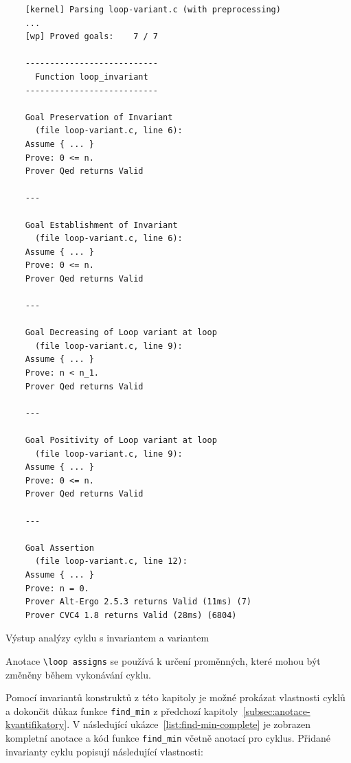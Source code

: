 \begin{listing}[H]
    \begin{verbatim}
    [kernel] Parsing loop-variant.c (with preprocessing)
    ...
    [wp] Proved goals:    7 / 7

    ---------------------------
      Function loop_invariant
    ---------------------------

    Goal Preservation of Invariant
      (file loop-variant.c, line 6):
    Assume { ... }
    Prove: 0 <= n.
    Prover Qed returns Valid

    ---

    Goal Establishment of Invariant
      (file loop-variant.c, line 6):
    Assume { ... }
    Prove: 0 <= n.
    Prover Qed returns Valid

    ---

    Goal Decreasing of Loop variant at loop
      (file loop-variant.c, line 9):
    Assume { ... }
    Prove: n < n_1.
    Prover Qed returns Valid

    ---

    Goal Positivity of Loop variant at loop
      (file loop-variant.c, line 9):
    Assume { ... }
    Prove: 0 <= n.
    Prover Qed returns Valid

    ---

    Goal Assertion
      (file loop-variant.c, line 12):
    Assume { ... }
    Prove: n = 0.
    Prover Alt-Ergo 2.5.3 returns Valid (11ms) (7)
    Prover CVC4 1.8 returns Valid (28ms) (6804)
    \end{verbatim}
    \caption{Výstup analýzy cyklu s invariantem a variantem}
    \label{list:loop-with-variant-output}
\end{listing}

Anotace \texttt{\textbackslash loop assigns} se používá k určení proměnných,
které mohou být změněny během vykonávání cyklu.

Pomocí invariantů konstruktů z této kapitoly
je možné prokázat vlastnosti cyklů a dokončit důkaz funkce \texttt{find\_min}
z předchozí kapitoly~\ref{subsec:anotace-kvantifikatory}.
V následující ukázce~\ref{list:find-min-complete} je zobrazen
kompletní anotace a kód funkce \texttt{find\_min} včetně anotací pro cyklus.
Přidané invarianty cyklu popisují následující vlastnosti:

